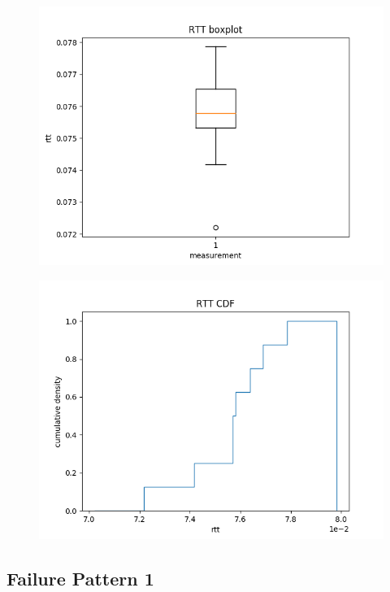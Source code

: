 \documentclass{article}
\begin{document}
\begin{figure}[h] \label{usrp-success-6}
	\includegraphics[width=\textwidth]{usrp_success_rtt_boxplot}	
\end{figure}

\begin{figure}[h] \label{usrp-success-7}
	\includegraphics[width=\textwidth]{usrp_success_rtt_cdf}	
\end{figure}

\clearpage

\subsection{Failure Pattern 1}
\end{document}
